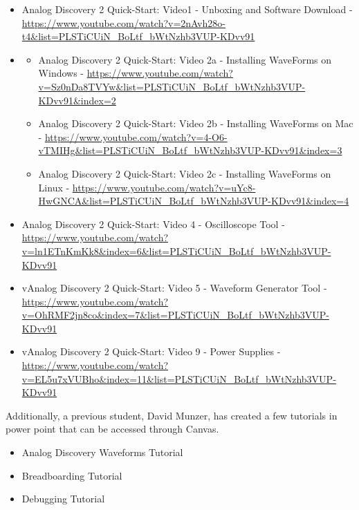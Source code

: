 \begin{itemize}
	\item Analog Discovery 2 Quick-Start: Video1 - Unboxing and Software Download - \url{https://www.youtube.com/watch?v=2nAvh28o-t4&list=PLSTiCUiN_BoLtf_bWtNzhb3VUP-KDvv91}
	\item 
		\begin{itemize}
			\item Analog Discovery 2 Quick-Start: Video 2a - Installing WaveForms on Windows - \url{https://www.youtube.com/watch?v=Sz0nDa8TVYw&list=PLSTiCUiN_BoLtf_bWtNzhb3VUP-KDvv91&index=2}
			\item Analog Discovery 2 Quick-Start: Video 2b - Installing WaveForms on Mac - \url{https://www.youtube.com/watch?v=4-O6-vTMIHg&list=PLSTiCUiN_BoLtf_bWtNzhb3VUP-KDvv91&index=3}
			\item Analog Discovery 2 Quick-Start: Video 2c - Installing WaveForms on Linux - \url{https://www.youtube.com/watch?v=uYc8-HwGNCA&list=PLSTiCUiN_BoLtf_bWtNzhb3VUP-KDvv91&index=4}
		\end{itemize}
	\item Analog Discovery 2 Quick-Start: Video 4 - Oscilloscope Tool - \url{https://www.youtube.com/watch?v=ln1ETnKmKk8&index=6&list=PLSTiCUiN_BoLtf_bWtNzhb3VUP-KDvv91}
	\item vAnalog Discovery 2 Quick-Start: Video 5 - Waveform Generator Tool - \url{https://www.youtube.com/watch?v=OhRMF2jn8co&index=7&list=PLSTiCUiN_BoLtf_bWtNzhb3VUP-KDvv91}
		\item vAnalog Discovery 2 Quick-Start: Video 9 - Power Supplies - \url{https://www.youtube.com/watch?v=EL5u7xVUBho&index=11&list=PLSTiCUiN_BoLtf_bWtNzhb3VUP-KDvv91}
\end{itemize}

Additionally, a previous student, David Munzer, has created a few tutorials in power point that can be accessed through Canvas. 

\begin{itemize}
	\item Analog Discovery Waveforms Tutorial
	\item Breadboarding Tutorial
	\item Debugging Tutorial
\end{itemize}

